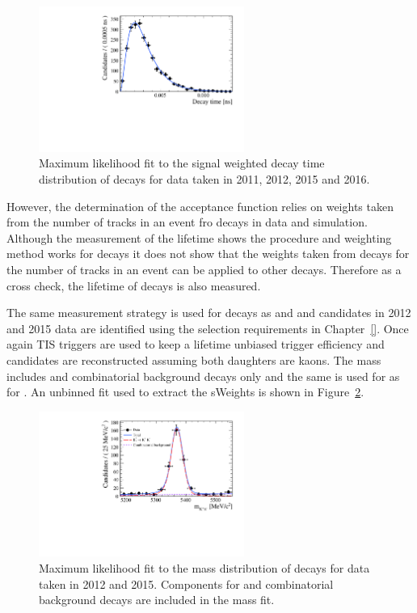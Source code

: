 \begin{figure}[htbp]
\centering
  \includegraphics[width=0.6\textwidth]{./Figs/LifetimeSystematics/Bd2KPi_lifetime_fit.pdf}
\caption{Maximum likelihood fit to the signal weighted decay time distribution of \bdkpi decays for data taken in 2011, 2012, 2015 and 2016. }
\label{fig:bdkpilifetimefit}
\end{figure}

However, the determination of the \bsmumu acceptance function relies on weights taken from the number of tracks in an event fro \bdkpi decays in data and simulation. Although the measurement of the \bdkpi lifetime shows the procedure and weighting method works for \bdkpi decays it does not show that the weights taken from \bdkpi decays for the number of tracks in an event can be applied to other decays. Therefore as a cross check, the lifetime of \bskk decays is also measured. 

The same measurement strategy is used for \bskk decays as \bsmumu and \bdkpi and candidates in 2012 and 2015 data are identified using the selection requirements in Chapter~\ref{}. Once again TIS triggers are used to keep a lifetime unbiased trigger efficiency and candidates are reconstructed assuming both daughters are kaons. The mass \pdf includes \bskk and combinatorial background decays only and the same \pdf is used for \bskk as for \bskpi. An unbinned \ml fit used to extract the sWeights is shown in Figure~\ref{fig:bskkmassfit}. 

\begin{figure}[htbp]
\centering
  \includegraphics[width=0.6\textwidth]{./Figs/LifetimeSystematics/Bs2KK_mass_fit.pdf}
\caption{Maximum likelihood fit to the mass distribution of \bskk decays for data taken in 2012 and 2015. Components for \bskk and combinatorial background decays are included in the mass fit. }
\label{fig:bskkmassfit}
\end{figure}



